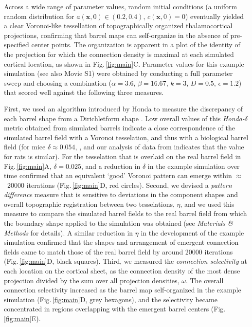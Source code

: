 \documentclass[9pt,lineno]{elife}
\newcommand{\cmnt}[1]{\textcolor{colcmnt}{#1}}
\newcommand{\metrics}[1]{\textcolor{colmetrics}{#1}}
\newcommand{\mb}[1]{\mathbf{#1}}
\begin{document}
\cmnt{Across a wide range of parameter values, random initial conditions (a
  uniform random distribution for $a(\mb{x},0)\in(0.2,0.4)$, $c(\mb{x},0)=0$)
  eventually yielded a clear Voronoi-like tessellation of topographically
  organized thalamocortical projections, confirming that barrel maps can
  self-organize in the absence of pre-specified center points. The
  organization is apparent in a plot of the identity of the projection for
  which the connection density is maximal at each simulated cortical location,
  as shown in Fig.\,\ref{fig:main}C. Parameter values for this example simulation
  (see also Movie S1) were obtained by
  conducting a full parameter sweep and choosing a combination
  ($\alpha=3.6$, $\beta=16.67$, $k=3$, $D=0.5$, $\epsilon=1.2$) that scored
  well against the following three measures.}

\metrics{First, we used an algorithm introduced by Honda to measure the
  discrepancy of each barrel shape from a Dirichletform shape}
\citep{honda_geometrical_1983}.  \metrics{Low overall values of this
  \emph{Honda-}$\delta$ metric obtained from simulated barrels indicate a
  close correspondence of the simulated barrel field with a Voronoi
  tesselation, and thus with a biological barrel field
  (for mice $\delta\approx0.054$,} \citealp{senft_mouse_1991}\metrics{, and
  our analysis of data from} \citealp{zheng_signal_2001} \metrics{ indicates that
  the value for rats is similar). For the tesselation
  that is overlaid on the real barrel field in Fig.\,\ref{fig:main}A,
  $\delta=0.025$, and a reduction in $\delta$ in the example simulation over
  time confirmed that an equivalent `good' Voronoi pattern can emerge
  within $\approx$~20000
  iterations (Fig.\,\ref{fig:main}D, red circles). Second, we devised a
  \emph{pattern difference} measure that is sensitive to deviations in the
  component shapes and overall topographic registration between two
  tesselations, $\eta$, and we used this measure to compare the simulated
  barrel fields to the real barrel field from which the boundary shape applied
  to the simulation was obtained (see \emph{Materials \& Methods} for
  details). A similar reduction in $\eta$ in the development of the example
  simulation confirmed that the shapes and arrangement of emergent connection
  fields came to match those of the real barrel field by around 20000
  iterations (Fig.\,\ref{fig:main}D, black squares). Third, we measured the
  \emph{connection selectivity} at each location on the cortical sheet, as the
  connection density of the most dense projection divided by the sum over all
  projection densities, $\omega$. The overall connection selectivity increased as the
  barrel map self-organized in the example simulation (Fig.\,\ref{fig:main}D,
  grey hexagons), and the selectivity became concentrated in regions
  overlapping with the emergent barrel centers (Fig.\,\ref{fig:main}E).}
\end{document}
